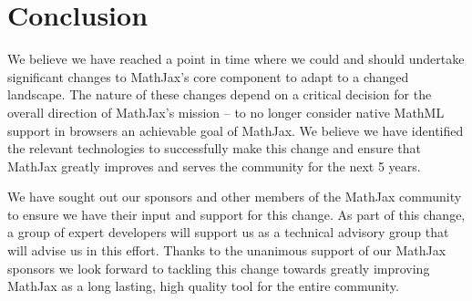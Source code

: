 \documentclass[]{amsart}
\begin{document}
\section{Conclusion}\label{conclusion}

We believe we have reached a point in time where we could and should
undertake significant changes to MathJax's core component to adapt to a
changed landscape. The nature of these changes depend on a critical
decision for the overall direction of MathJax's mission -- to no longer
consider native MathML support in browsers an achievable goal of
MathJax. We believe we have identified the relevant technologies to
successfully make this change and ensure that MathJax greatly improves
and serves the community for the next 5 years.

We have sought out our sponsors and other members of the MathJax
community to ensure we have their input and support for this change. As
part of this change, a group of expert developers will support us as a
technical advisory group that will advise us in this effort. Thanks to
the unanimous support of our MathJax sponsors we look forward to
tackling this change towards greatly improving MathJax as a long
lasting, high quality tool for the entire community.
\end{document}
